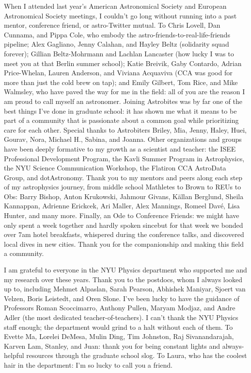 When I attended last year's American Astronomical Society and European Astronomical Society meetings, I couldn't go long without running into a past mentor, conference friend, or astro-Twitter mutual.
To Chris Lovell, Dan Cunnama, and Pippa Cole, who embody the astro-friends-to-real-life-friends pipeline; Alex Gagliano, Jenny Calahan, and Hayley Beltz (solidarity squad forever); Gillian Beltz-Mohrmann and Lachlan Lancaster (how lucky I was to meet you at that Berlin summer school); Katie Breivik, Gaby Contardo, Adrian Price-Whelan, Lauren Anderson, and Viviana Acquaviva (CCA was good for more than just the cold brew on tap); and Emily Gilbert, Tom Rice, and Mike Walmsley, who have paved the way for me in the field: all of you are the reason I am proud to call myself an astronomer.
Joining Astrobites was by far one of the best things I've done in graduate school: it has shown me what it means to be part of a community that is passionate about a common goal while prioritizing care for each other. Special thanks to Astrobiters Briley, Mia, Jenny, Haley, Huei, Gourav, Nora, Michael H., Sabina, and Joanna.
Other organizations and groups have been deeply formative to my growth as a scientist and teacher: the ISEE Professional Development Program, the Kavli Summer Program in Astrophysics, the NYU Science Communication Workshop, the Flatiron CCA AstroData Group, and dotAstronomy. 
Thank you to my mentors and peers along each step of my astrophysics journey, from middle school Mathletes to Brown to REUs to Obs: Barry Bishop, Anton Krukowski, Jahmour Givans, K\"allan Berglund, Sheila Kannappan, Adrienne Erickcek,  Ari Maller, Alex Mannings, Romeel Dav\'e, Lisa Hunter, and many more.
Finally, an Ode to Conference Friends: we might have only spent a week together and hardly spoken since{\emdash}but for that week we bonded over 7am hotel breakfasts, whispered during the conference talks, and discovered local dives in new cities.
Thank you for the companionship and making this field a community.


I am grateful to everyone in the NYU Physics department who supported me and my research over these years.
Thank you to the postdocs, whom I always looked up to, including Mehmet Alpaslan, Sarah Pearson, Abhishek Maniyar, Sjoert van Velzen, Boris Leistedt, and Oren Slone.
I've been lucky to have the guidance of Professors Roman Scoccimarro, Anthony Pullen, Maryam Modjaz, and Andre Adler (the most dedicated teacher-of-teachers).
I can't thank the NYU Physics staff enough; the department would grind to a halt without each of them.
To Evette Ma, Lorelei DeMesa, Mulin Ding, Tim Johnston, Raj Sivanandarajah, Karven Lam, Stanley, and Juan: thank you for being constant lights and always-helpful resources through the graduate school slog.
To Laura, who has the coolest hair in the department: I'm so lucky to call you a friend.


